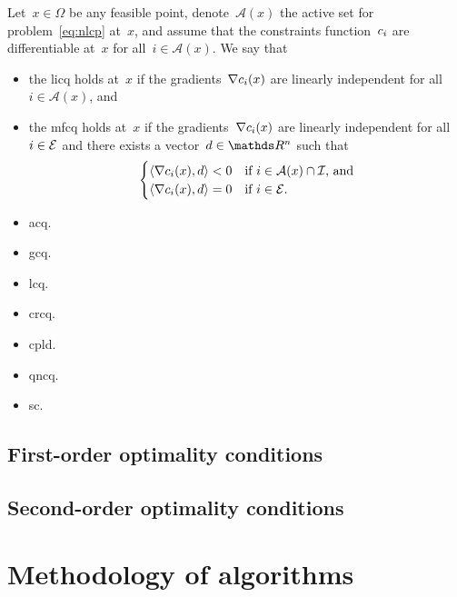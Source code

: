 \begin{definition}
    Let~$x \in \Omega$ be any feasible point, denote~$\mathcal{A}(x)$ the active set for problem~\cref{eq:nlcp} at~$x$, and assume that the constraints function~$c_{i}$ are differentiable at~$x$ for all~$i \in \mathcal{A}(x)$.
    We say that
    \begin{itemize}
        \item the \gls{licq} holds at~$x$ if the gradients~$\nabla c_{i}(x)$ are linearly independent for all~$i \in \mathcal{A}(x)$, and
        \item the \gls{mfcq} holds at~$x$ if the gradients~$\nabla c_{i}(x)$ are linearly independent for all~$i \in \mathcal{E}$ and there exists a vector~$d \in \R^n$ such that
        \begin{equation*}
            \begin{cases}
                \langle\nabla c_{i}(x), d\rangle < 0    & \text{if~$i \in \mathcal{A}(x) \cap \mathcal{I}$, and}\\
                \langle\nabla c_{i}(x), d\rangle = 0    & \text{if~$i \in \mathcal{E}$}.
            \end{cases}
        \end{equation*}
    \end{itemize}
\end{definition}

\begin{itemize}
    \item \gls{acq}.
    \item \gls{gcq}.
    \item \gls{lcq}.
    \item \gls{crcq}.
    \item \gls{cpld}.
    \item \gls{qncq}.
    \item \gls{sc}.
\end{itemize}

\subsection{First-order optimality conditions}

\subsection{Second-order optimality conditions}

\section{Methodology of  algorithms}


